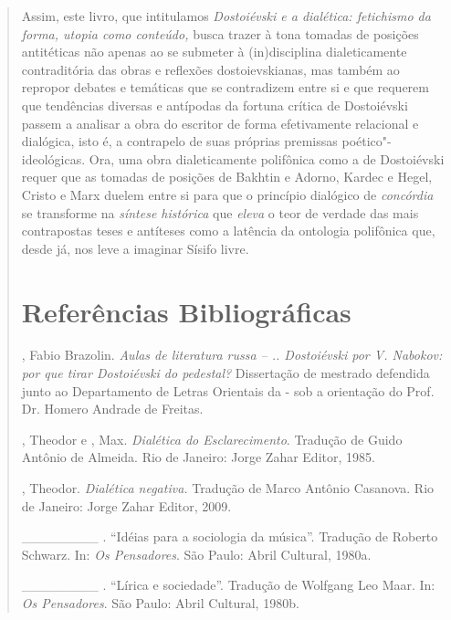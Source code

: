 {\begin{quote}
Assim, este livro, que intitulamos \emph{Dostoiévski e a dialética:
fetichismo da forma, utopia como conteúdo,} busca trazer à tona tomadas
de posições antitéticas não apenas ao se submeter à (in)disciplina
dialeticamente contraditória das obras e reflexões dostoievskianas, mas
também ao repropor debates e temáticas que se contradizem entre si e que
requerem que tendências diversas e antípodas da fortuna crítica de
Dostoiévski passem a analisar a obra do escritor de forma efetivamente
relacional e dialógica, isto é, a contrapelo de suas próprias premissas
poético"-ideológicas. Ora, uma obra dialeticamente polifônica como a de
Dostoiévski requer que as tomadas de posições de Bakhtin e Adorno,
Kardec e Hegel, Cristo e Marx duelem entre si para que o princípio
dialógico de \emph{concórdia} se transforme na \emph{síntese histórica}
que \emph{eleva} o teor de verdade das mais contrapostas teses e
antíteses como a latência da ontologia polifônica que, desde já, nos
leve a imaginar Sísifo livre.

\chapter*{Referências Bibliográficas}



\begin{Parskip}
, Fabio Brazolin. \emph{Aulas de literatura russa -- ..
Dostoiévski por V. Nabokov: por que tirar Dostoiévski do pedestal?}
Dissertação de mestrado defendida junto ao Departamento de Letras
Orientais da - sob a orientação do Prof. Dr. Homero Andrade de
Freitas.

, Theodor e , Max. \emph{Dialética do Esclarecimento}.
Tradução de Guido Antônio de Almeida. Rio de Janeiro: Jorge Zahar
Editor, 1985.

, Theodor. \emph{Dialética negativa.} Tradução de Marco Antônio
Casanova. Rio de Janeiro: Jorge Zahar Editor, 2009.

\_\_\_\_\_\_\_\_ . ``Idéias para a sociologia da música''. Tradução de
Roberto Schwarz. In: \emph{Os Pensadores}. São Paulo: Abril Cultural,
1980a.

\_\_\_\_\_\_\_\_ . ``Lírica e sociedade''. Tradução de Wolfgang Leo
Maar. In: \emph{Os Pensadores}. São Paulo: Abril Cultural, 1980b.


\end{Parskip}
\end{quote}}
